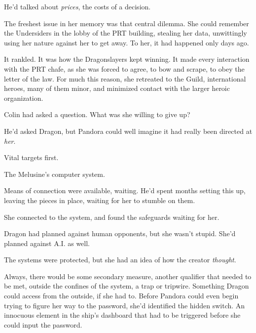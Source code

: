 He'd talked about \emph{prices}, the costs of a decision.



The freshest issue in her memory was that central dilemma.  She could remember the Undersiders in the lobby of the PRT building, stealing her data, unwittingly using her nature against her to get away.  To her, it had happened only days ago.



It rankled.  It was how the Dragonslayers kept winning.  It made every interaction with the PRT chafe, as she was forced to agree, to bow and scrape, to obey the letter of the law.  For much this reason, she retreated to the Guild, international heroes, many of them minor, and minimized contact with the larger heroic organization.



Colin had asked a question.  What was she willing to give up?



He'd asked Dragon, but Pandora could well imagine it had really been directed at \emph{her}.



Vital targets first.



The Melusine's computer system.



Means of connection were available, waiting.  He'd spent months setting this up, leaving the pieces in place, waiting for her to stumble on them.



She connected to the system, and found the safeguards waiting for her.



Dragon had planned against human opponents, but she wasn't stupid.  She'd planned against A.I. as well.



The systems were protected, but she had an idea of how the creator \emph{thought}.



Always, there would be some secondary measure, another qualifier that needed to be met, outside the confines of the system, a trap or tripwire.  Something Dragon could access from the outside, if she had to.  Before Pandora could even begin trying to figure her way to the password, she'd identified the hidden switch.  An innocuous element in the ship's dashboard that had to be triggered before she could input the password.



